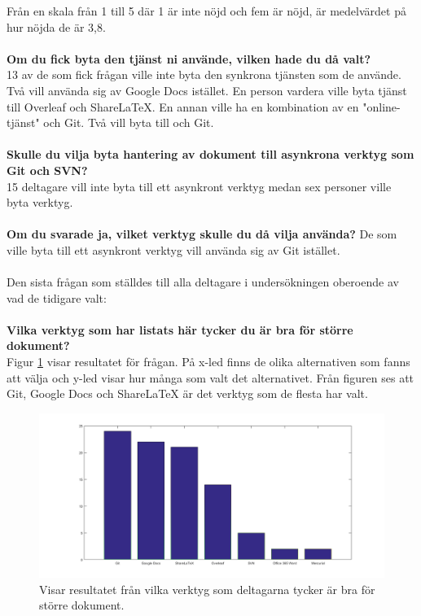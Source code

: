 Från en skala från 1 till 5 där 1 är inte nöjd och fem är nöjd, är medelvärdet på hur nöjda de är 3,8.\\\\
\textbf{Om du fick byta den tjänst ni använde, vilken hade du då valt?}\\ 
13 av de som fick frågan ville inte byta den synkrona tjänsten som de använde. Två vill använda sig av Google Docs istället. En person vardera ville byta tjänst till Overleaf och ShareLaTeX. En annan ville ha en kombination av en "online-tjänst" och Git. Två vill byta till \latex och Git.\\\\
\textbf{Skulle du vilja byta hantering av dokument till asynkrona verktyg som Git och SVN?}\\
15 deltagare vill inte byta till ett asynkront verktyg medan sex personer ville byta verktyg.\\\\
\textbf{Om du svarade ja, vilket verktyg skulle du då vilja använda?}
De som ville byta till ett asynkront verktyg vill använda sig av Git istället.\\\\
Den sista frågan som ställdes till alla deltagare i undersökningen oberoende av vad de tidigare valt:\\\\
\newpage
\textbf{Vilka verktyg som har listats här tycker du är bra för större dokument?}\\
Figur \ref{fig:best_document_tool} visar resultatet för frågan. På x-led finns de olika alternativen som fanns att välja och y-led visar hur många som valt det alternativet. Från figuren ses att Git, Google Docs och ShareLaTeX är det verktyg som de flesta har valt.

\begin{figure}[H]	
	\includegraphics[scale=0.4]{figures/best_document_tool.png}
	\centering
	\caption{Visar resultatet från vilka verktyg som deltagarna tycker är bra för större dokument.}
	\label{fig:best_document_tool}
\end{figure}

